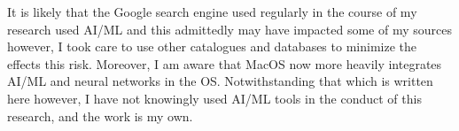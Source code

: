 \documentclass[noraggedright]{turabian-researchpaper}
\begin{document}
It is likely that the Google search engine used regularly in the course of
my research used AI/ML and this admittedly may have impacted some of my 
sources however, I took care to use other catalogues and databases to 
minimize the effects this risk.  Moreover, I am aware that MacOS now more
heavily integrates AI/ML and neural networks in the OS.  Notwithstanding that
which is written here however, I have not knowingly used AI/ML tools in the
conduct of this research, and the work is my own.

\newpage

\printbibliography
\end{document}
